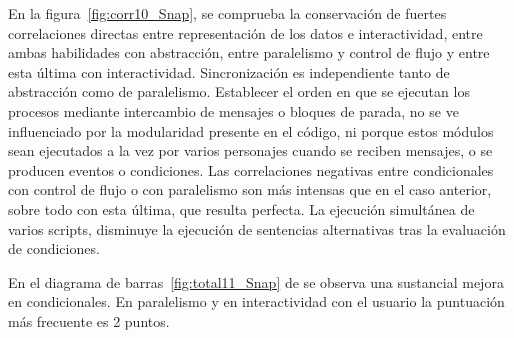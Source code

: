 \documentclass[a4paper, 12pt]{book}
\begin{document}
En la figura~\ref{fig:corr10_Snap}, se comprueba la conservación de fuertes correlaciones directas entre representación de los datos e interactividad, entre ambas habilidades con abstracción, entre paralelismo y control de flujo y entre esta última con interactividad. Sincronización es independiente tanto de abstracción como de paralelismo. Establecer el orden en que se ejecutan los procesos mediante intercambio de mensajes o bloques de parada, no se ve influenciado por la modularidad presente en el código, ni porque estos módulos sean ejecutados a la vez por varios personajes cuando se reciben mensajes, o se producen eventos o condiciones. Las correlaciones negativas entre condicionales con control de flujo o con paralelismo son más intensas que en el caso anterior, sobre todo con esta última, que resulta perfecta. La ejecución simultánea de varios scripts, disminuye la ejecución de sentencias alternativas tras la evaluación de condiciones.

En el diagrama de barras~\ref{fig:total11_Snap} de se observa una sustancial mejora en condicionales. En paralelismo y en interactividad con el usuario la puntuación más frecuente es 2 puntos.
\end{document}
